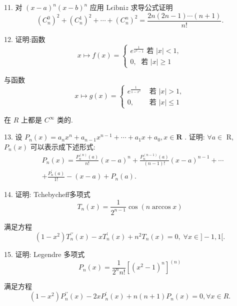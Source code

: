 11. 对 ${\left( x - a\right) }^{n}{\left( x - b\right) }^{n}$ 应用 $\mathrm{L}\epsilon \mathrm{{ibni}}z$ 求导公式证明
$${\left( {C}_{n}^{0}\right) }^{2} + {\left( {C}_{n}^{1}\right) }^{2} + \cdots  + {\left( {C}_{n}^{n}\right) }^{2} = \frac{{2n}\left( {{2n} - 1}\right) \cdots \left( {n + 1}\right) }{n!}.$$

12. 证明:函数
$$x \mapsto  f\left( x\right)  = \left\{  \begin{array}{l} {e}^{\frac{1}{{x}^{2} - 1}}\text{ 若 }\left| x\right|  < 1, \\  0,\;\text{ 若 }\left| x\right|  \geq  1 \end{array}\right.$$

与函数
$$x \mapsto  g\left( x\right)  = \left\{  \begin{array}{ll} {e}^{\frac{1}{1 - {x}^{2}}} & \text{ 若 }\left| x\right|  > 1, \\  0, & \text{ 若 }\left| x\right|  \leq  1 \end{array}\right.$$

在 $R$ 上都是 ${C}^{\infty }$ 类的.

13. 设 ${P}_{n}\left( x\right)  = {a}_{n}{x}^{n} + {a}_{n - 1}{x}^{n - 1} + \cdots  + {a}_{1}x + {a}_{0},x \in  \mathbf{R}$ . 证明: $\forall a \in$ R, ${P}_{n}\left( x\right)$ 可以表示成下述形式:
\begin{align*}
	&{P}_{n}\left( x\right)  = \frac{{P}_{n}^{\left( n\right) }\left( a\right) }{n!}{\left( x - a\right) }^{n} + \frac{{P}_{n}^{\left( n - 1\right) }\left( a\right) }{\left( {n - 1}\right) !}{\left( x - a\right) }^{n - 1} + \cdots\\
	&+ \frac{{P}_{n}^{\prime }\left( a\right) }{1!} - \left( {x - a}\right)  + {P}_{n}\left( a\right) .
\end{align*}

14. 证明: Tchebycheff多项式
$${T}_{n}\left( x\right)  = \frac{1}{{2}^{n - 1}}\cos \left( {n\arccos x}\right)$$

满足方程
$$\left( {1 - {x}^{2}}\right) {T}_{n}^{\prime \prime }\left( x\right)  - x{T}_{n}^{\prime }\left( x\right)  + {n}^{2}{T}_{n}\left( x\right)  = 0,\;\forall x \in  \rbrack  - 1,1\lbrack .$$

15. 证明: Legendre 多项式
$${P}_{n}\left( x\right)  = \frac{1}{{2}^{n}n!}{\left\lbrack  {\left( {x}^{2} - 1\right) }^{n}\right\rbrack  }^{\left( n\right) }$$

满足方程
$$\left( {1 - {x}^{2}}\right) {P}_{n}^{\prime \prime }\left( x\right)  - {2x}{P}_{n}^{\prime }\left( x\right)  + n\left( {n + 1}\right) {P}_{n}\left( x\right)  = 0,\forall x \in  R.$$

